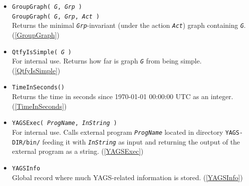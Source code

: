 \documentclass[a4paper,11pt]{report}
\begin{document}
{{\begin{itemize}
\item \texttt{GroupGraph( \mbox{\texttt{\mdseries\slshape G}}, \mbox{\texttt{\mdseries\slshape Grp}} )}\\
 \texttt{GroupGraph( \mbox{\texttt{\mdseries\slshape G}}, \mbox{\texttt{\mdseries\slshape Grp}}, \mbox{\texttt{\mdseries\slshape Act}} )}\\
 Returns the minimal \mbox{\texttt{\mdseries\slshape Grp}}-invariant (under the action \mbox{\texttt{\mdseries\slshape Act}}) graph containing \mbox{\texttt{\mdseries\slshape G}}. (\ref{GroupGraph}) 
\item \texttt{QtfyIsSimple( \mbox{\texttt{\mdseries\slshape G}} )}\\
 For internal use. Returns how far is graph \mbox{\texttt{\mdseries\slshape G}} from being simple. (\ref{QtfyIsSimple}) 
\item \texttt{TimeInSeconds()}\\
 Returns the time in seconds since 1970-01-01 00:00:00 UTC as an integer. (\ref{TimeInSeconds}) 
\item \texttt{YAGSExec( \mbox{\texttt{\mdseries\slshape ProgName}}, \mbox{\texttt{\mdseries\slshape InString}} )}\\
 For internal use. Calls external program \mbox{\texttt{\mdseries\slshape ProgName}} located in directory \texttt{YAGS-DIR/bin/} feeding it with \mbox{\texttt{\mdseries\slshape InString}} as input and returning the output of the external program as a string. (\ref{YAGSExec}) 
\item \texttt{YAGSInfo}\\
 Global record where much \textsf{YAGS}-related information is stored. (\ref{YAGSInfo}) 
\end{itemize}
 }

 }
\end{document}
